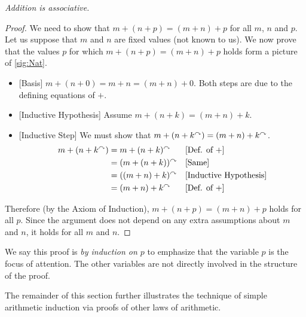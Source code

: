 \begin{fact}

  \emph{Addition is associative.}

\begin{proof}
  We need to show that $m + (n+p) = (m+n)+p$ for all $m$, $n$ and $p$.
  Let us suppose that $m$ and $n$ are fixed values (not known to us).
  We now prove that the values $p$ for which $m+(n+p) = (m+n)+p$ holds
  form a picture of \ref{sig:Nat}.
  \begin{itemize}
  \item{}[Basis] $m+(n+0) = m+n = (m+n)+0$. Both steps are due to the
    defining equations of $+$.
  \item{}[Inductive Hypothesis] Assume $m+(n+k) = (m+n)+k$.
  \item{}[Inductive Step] We must show that $m+(n+k^\curvearrowright) =
    (m+n)+k^\curvearrowright$. 
    \begin{align*}
      m+(n+k^\curvearrowright) &= m + (n+k)^\curvearrowright &&\text{[Def. of +]}\\
      &= (m+(n+k))^\curvearrowright&&\text{[Same]}\\
      &= ((m+n)+k)^\curvearrowright&&\text{[Inductive Hypothesis]}\\
      &= (m+n)+k^\curvearrowright &&\text{[Def. of $+$]}
    \end{align*}
  \end{itemize}
  Therefore (by the Axiom of Induction), $m+(n+p) = (m+n)+p$ holds for
  all $p$. Since the argument does not depend on any extra assumptions
  about $m$ and $n$, it holds for all $m$ and $n$.
\end{proof}
\end{fact}

  We say this proof is \emph{by induction on $p$} to emphasize that
  the variable $p$ is the focus of attention. The other variables are
  not directly involved in the structure of the proof.

The remainder of this section further illustrates the technique of
simple arithmetic induction via proofs of other laws of arithmetic.

\ipadbreak

